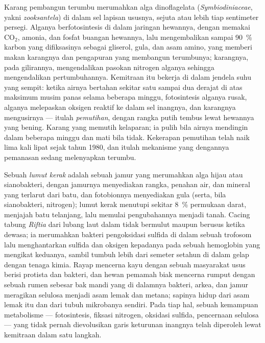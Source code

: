 \begin{definition}\label{def:b3:microbiomes:coral}
Karang pembangun terumbu merumahkan alga dinoflagelata (\emph{Symbiodiniaceae},
yakni \emph{zooksantela}) di dalam sel lapisan ususnya, sejuta atau lebih tiap
sentimeter persegi. Alganya berfotosintesis di dalam jaringan hewannya, dengan
memakai CO$_{2}$, amonia, dan fosfat buangan hewannya, lalu mengembalikan
sampai \qty{90}{\%} karbon yang difiksasinya sebagai gliserol, gula, dan asam
amino, yang memberi makan karangnya dan pengapuran yang membangun terumbunya;
karangnya, pada gilirannya, mengendalikan pasokan nitrogen alganya sehingga
mengendalikan pertumbuhannya. Kemitraan itu bekerja di dalam jendela suhu yang
sempit: ketika airnya bertahan sekitar satu sampai dua derajat di atas maksimum
musim panas selama beberapa minggu, fotosintesis alganya rusak, alganya
melepaskan oksigen reaktif ke dalam sel inangnya, dan karangnya mengusirnya ---
itulah \emph{pemutihan}, dengan rangka putih tembus lewat hewannya yang
bening. Karang yang memutih kelaparan; ia pulih bila airnya mendingin dalam
beberapa minggu dan mati bila tidak. Kekerapan pemutihan telah naik lima kali
lipat sejak tahun 1980, dan itulah mekanisme yang dengannya pemanasan sedang
melenyapkan terumbu.
\end{definition}

\begin{example}\label{ex:b3:microbiomes:habitats}
Sebuah \emph{lumut kerak} adalah sebuah jamur yang merumahkan alga hijau
atau sianobakteri, dengan jamurnya menyediakan rangka, penahan air, dan mineral yang
terlarut dari batu, dan fotobionnya menyediakan gula (serta, bila sianobakteri,
nitrogen); lumut kerak menutupi sekitar \qty{8}{\%} permukaan darat, menjajah
batu telanjang, lalu memulai pengubahannya menjadi tanah. Cacing tabung
\emph{Riftia} dari lubang laut dalam tidak bermulut maupun berusus ketika
dewasa; ia merumahkan bakteri pengoksidasi sulfida di dalam sebuah trofosom
lalu menghantarkan sulfida dan oksigen kepadanya pada sebuah hemoglobin yang
mengikat keduanya, sambil tumbuh lebih dari semeter setahun di dalam gelap
dengan tenaga kimia. Rayap mencerna kayu dengan sebuah masyarakat usus berisi
protista dan bakteri, dan hewan pemamah biak mencerna rumput dengan sebuah
rumen sebesar bak mandi yang di dalamnya bakteri, arkea, dan jamur meragikan
selulosa menjadi asam lemak dan metana; sapinya hidup dari asam lemak itu dan
dari tubuh mikrobanya sendiri. Pada tiap hal, sebuah kemampuan metabolisme ---
fotosintesis, fiksasi nitrogen, oksidasi sulfida, pencernaan selulosa --- yang
tidak pernah dievolusikan garis keturunan inangnya telah diperoleh lewat
kemitraan dalam satu langkah.
\end{example}

